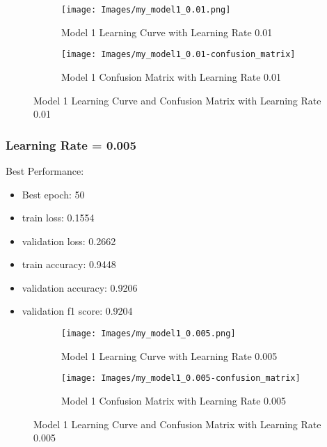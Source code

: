 \documentclass{article}
\begin{document}
\begin{figure}[h]
    \begin{subfigure}{0.5\textwidth}
        \texttt{[image: Images/my\_model1\_0.01.png]} 
        \caption{Model 1 Learning Curve with Learning Rate 0.01}
        \label{fig:model1_lr_0.01}
    \end{subfigure}
    \begin{subfigure}{0.5\textwidth}
        \texttt{[image: Images/my\_model1\_0.01-confusion\_matrix]} 
        \caption{Model 1 Confusion Matrix with Learning Rate 0.01}
        \label{fig:model1_lr_0.01_confusion_matrix}
    \end{subfigure}
    \caption{Model 1 Learning Curve and Confusion Matrix with Learning Rate 0.01}
    \label{fig:model1_lr_0.01_combined}
\end{figure}

\subsubsection{Learning Rate = 0.005}
Best Performance:
\begin{itemize}
    \item Best epoch: 50
    \item train loss: 0.1554
    \item validation loss: 0.2662
    \item train accuracy: 0.9448
    \item validation accuracy: 0.9206
    \item validation f1 score: 0.9204
\end{itemize}

\begin{figure}[h]
    \begin{subfigure}{0.5\textwidth}
        \texttt{[image: Images/my\_model1\_0.005.png]} 
        \caption{Model 1 Learning Curve with Learning Rate 0.005}
        \label{fig:model1_lr_0.005}
    \end{subfigure}
    \begin{subfigure}{0.5\textwidth}
        \texttt{[image: Images/my\_model1\_0.005-confusion\_matrix]} 
        \caption{Model 1 Confusion Matrix with Learning Rate 0.005}
        \label{fig:model1_lr_0.005_confusion_matrix}
    \end{subfigure}
    \caption{Model 1 Learning Curve and Confusion Matrix with Learning Rate 0.005}
    \label{fig:model1_lr_0.005_combined}
\end{figure}
\end{document}
